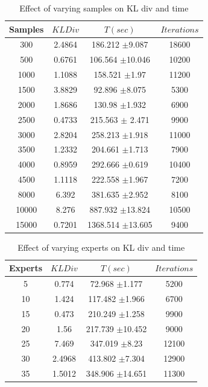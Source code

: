 \documentclass[10pt, conference, compsocconf]{IEEEtran}
\begin{document}
\begin{table}[htdp]
\begin{center}
\begin{tabular}{| c | c | c | c |}
\hline
Samples & $KL Div$ & $T(sec)$ & $Iterations$ \\
\hline
300 & 2.4864 & 186.212 $\pm$9.087 & 18600 \\
500 & 0.6761 & 106.564 $\pm$10.046 & 10200 \\
1000 & 1.1088 & 158.521 $\pm$1.97  & 11200 \\
1500 & 3.8829 & 92.896 $\pm$8.075  & 5300 \\
2000 & 1.8686 & 130.98 $\pm$1.932 & 6900 \\
2500 & 0.4733 & 215.563 $\pm$ 2.471 & 9900 \\
3000 & 2.8204 & 258.213 $\pm1.918$ & 11000 \\
3500 & 1.2332 & 204.661 $\pm$1.713 & 7900 \\
4000 & 0.8959 & 292.666 $\pm$0.619 & 10400  \\
4500 & 1.1118 & 222.558 $\pm$1.967 & 7200  \\
8000 & 6.392 & 381.635 $\pm$2.952 & 8100  \\
10000 & 8.276 & 887.932 $\pm$13.824 & 10500  \\
15000 & 0.7201 & 1368.514 $\pm$13.605 & 9400  \\
\hline
\end{tabular}
\end{center}
\caption{Effect of varying samples on KL div and time}
\label{table: error}
\end{table}

\begin{table}[htdp]
\begin{center}
\begin{tabular}{| c | c | c | c |}
\hline
Experts & $KL Div$ & $T(sec)$ & $Iterations$ \\
\hline
5 & 0.774 & 72.968 $\pm$1.177 & 5200 \\
10 & 1.424 & 117.482 $\pm$1.966 & 6700 \\
15 & 0.473 & 210.249 $\pm$1.258  & 9900 \\
20 & 1.56 & 217.739 $\pm$10.452 & 9000 \\
25 & 7.469 & 347.019 $\pm$8.23 & 12100 \\
30 & 2.4968 & 413.802 $\pm$7.304 & 12900 \\
35 & 1.5012 & 348.906 $\pm$14.651 & 11300 \\
\hline
\end{tabular}
\end{center}
\caption{Effect of varying experts on KL div and time}
\label{table: error}
\end{table}
\end{document}
